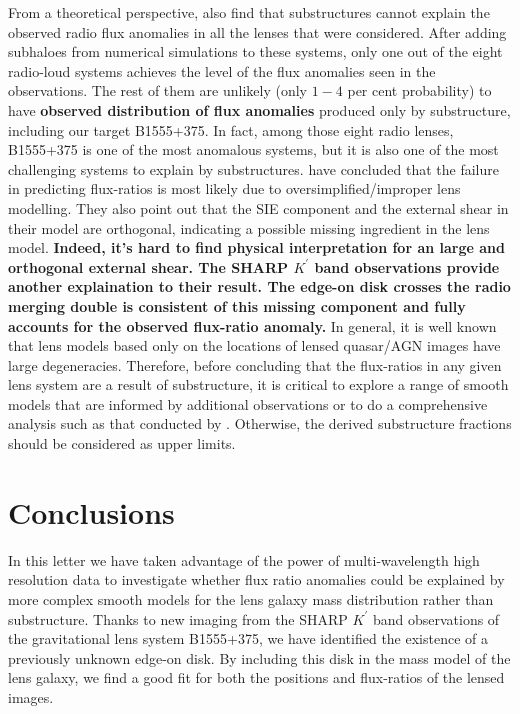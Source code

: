 \documentclass[useAMS,usenatbib]{mnras}
\begin{document}
From a theoretical perspective, \citet{Xu14} also find that substructures
cannot explain the observed radio flux anomalies in all the lenses
that were considered. After adding subhaloes from numerical simulations
to these systems, only one out of the eight radio-loud systems
achieves the level of the flux anomalies seen in the observations.  The rest of
them are unlikely (only $1 - 4$ per cent probability) to have \textbf{observed distribution of flux
anomalies} produced only by substructure, including our target B1555+375.
In fact, among those eight radio lenses, B1555+375 is one of the most
anomalous systems, but it is also one of the most challenging systems
to explain by substructures. \citet{Xu14} have concluded that the failure in
predicting flux-ratios is most likely due to oversimplified/improper lens
modelling. They also point out that the SIE component and the external
shear in their model are orthogonal, indicating a possible missing
ingredient in the lens model.
\textbf{Indeed, it's hard to find physical interpretation for an large and orthogonal external shear.
The SHARP $K^{\prime}$ band observations provide another explaination to their result. The edge-on disk crosses the
radio merging double is consistent of this missing component and fully accounts for the observed flux-ratio anomaly.} 
In general, it is well known  \citep[e.g.][]{Ka91} that lens models based only on the locations of lensed
quasar/AGN images have large degeneracies. Therefore, before
concluding that the flux-ratios in any given lens system are a result
of substructure, it is critical to explore a range of smooth models
that are informed by additional observations or to do a comprehensive
analysis such as that conducted by \citet{Xu14}. Otherwise, the derived
substructure fractions should be considered as upper limits.
 

\section{Conclusions}
In this letter we have taken advantage of the power of
multi-wavelength high resolution data to investigate whether flux
ratio anomalies could be explained by more complex smooth models for
the lens galaxy mass distribution rather than substructure. Thanks to
new imaging from the SHARP $K^{\prime}$ band observations of the
gravitational lens system B1555+375, we have identified the existence
of a previously unknown edge-on disk. By including this disk in the
mass model of the lens galaxy, we find a good fit for both the
positions and flux-ratios of the lensed images. 
\end{document}
